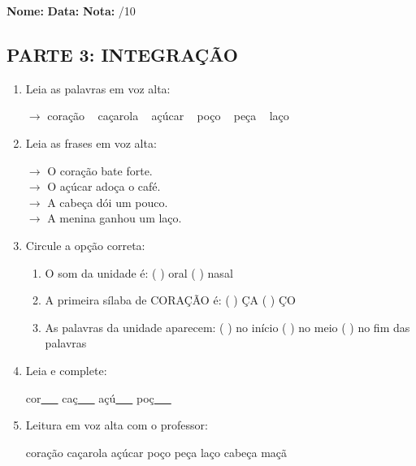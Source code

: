 \begin{exercicio}

\noindent\textbf{Nome:} \underline{\hspace{3.2cm}} \quad \textbf{Data:} \underline{\hspace{1.6cm}} \quad \textbf{Nota:} \underline{\hspace{0.9cm}}/10


\subsection*{PARTE 3: INTEGRAÇÃO}

\begin{enumerate}[resume]

  \item Leia as palavras em voz alta:
  \begin{center}
  $\rightarrow$ coração ~ caçarola ~ açúcar ~ poço ~ peça ~ laço
  \end{center}

  \item Leia as frases em voz alta:
  \begin{center}
  $\rightarrow$ O coração bate forte.\\
  $\rightarrow$ O açúcar adoça o café.\\
  $\rightarrow$ A cabeça dói um pouco.\\
  $\rightarrow$ A menina ganhou um laço.\\
  \end{center}

  \item Circule a opção correta:
  \begin{enumerate}[label=(\alph*)]

    \item O som da unidade é: ( ) oral ( ) nasal 

    \item A primeira sílaba de CORAÇÃO é: ( ) ÇA ( ) ÇO

    \item As palavras da unidade aparecem: ( ) no início ( ) no meio ( ) no fim das palavras

  \end{enumerate}

  \item Leia e complete:
  \begin{center}
  cor\underline{~~~} \quad caç\underline{~~~} \quad açú\underline{~~~} \quad poç\underline{~~~}
  \end{center}

  \item Leitura em voz alta com o professor:
  \begin{center}
  coração \quad caçarola \quad açúcar \quad poço \quad peça \quad laço \quad cabeça \quad maçã
  \end{center}

\end{enumerate}

\end{exercicio}

